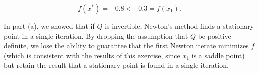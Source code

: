 \begin{solution}
    $$
    f(x^*) = -0.8 < -0.3 = f(x_1).
    $$

    In part (a), we showed that if $Q$ is invertible, Newton's method finds a stationary point in a single iteration. By
    dropping the assumption that $Q$ be positive definite, we lose the ability to guarantee that the first Newton
    iterate minimizes $f$ (which is consistent with the results of this exercise, since $x_1$ is a saddle point) but 
    retain the result that a stationary point is found in a single iteration.
    \ \\
\end{solution}